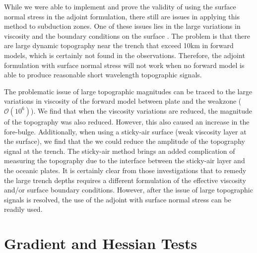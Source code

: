 \documentclass[12pt]{article}
\begin{document}
 While we were able to implement and prove the validity of using the surface normal stress in the adjoint formulation, there still are issues in applying this method to subduction zones. One of these issues lies in the large variations in viscosity and the boundary conditions on the surface \citep{crameri2017dynamical}. The problem is that there are large dynamic topography near the trench that exceed 10km in forward models, which is certainly not found in the observations. Therefore, the adjoint formulation with surface normal stress will not work when no forward model is able to produce reasonable short wavelength topographic signals. 
 
 
  The problematic issue of large topographic magnitudes can be traced to the large variations in viscosity of the forward model between plate and the weakzone ($\mathcal{O}(10^6)$). We find that when the viscosity variations are reduced, the magnitude of the topography was also reduced. However, this also caused an increase in the fore-bulge. Additionally, when using a sticky-air surface (weak viscosity layer at the surface), we find that the we could reduce the amplitude of the topography signal at the trench. The sticky-air method brings an added complication of measuring the topography due to the interface between the sticky-air layer and the oceanic plates. It is certainly clear from those investigations that to remedy the large trench depths requires a different formulation of the effective viscosity and/or surface boundary conditions. However, after the issue of large topographic signals is resolved, the use of the adjoint with surface normal stress can be readily used.




\appendix
\section{Gradient and Hessian Tests}
\end{document}
